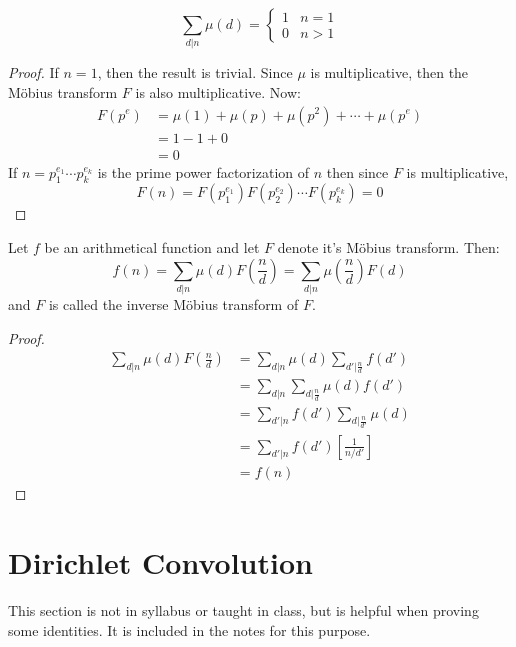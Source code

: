 \documentclass[12pt,letterpaper]{book}
\theoremstyle{definition}
\begin{document}
\begin{lemma}
  \[\sum_{d|n} \mu(d) = \begin{cases} 
    1 & n=1 \\
    0 & n > 1
  \end{cases}\] 
\end{lemma}
\begin{proof}
  If $n=1$, then the result is trivial. Since $\mu$ is multiplicative, then the M\"{o}bius transform $F$ is also multiplicative. Now:
  \begin{align*}
    F(p^e) &= \mu(1) + \mu(p) + \mu(p^2) + \cdots + \mu(p^e) \\
           &= 1-1+0\\
           &= 0
  \end{align*}
  If $n = p_1^{e_1} \cdots p_k^{e_k}$ is the prime power factorization of $n$ then since $F$ is multiplicative,
  \[F(n) = F(p_1^{e_1}) F(p_2^{e_2}) \cdots F(p_k^{e_k}) = 0\]
\end{proof}

\begin{theorem}
  Let $f$ be an arithmetical function and let $F$ denote it's M\"{o}bius transform. Then:
  \[f(n) = \sum_{d|n} \mu(d) F \left( \frac{n}{d} \right) = \sum_{d|n} \mu \left( \frac{n}{d} \right)F(d)\]
  and $F$ is called the inverse M\"{o}bius transform of $F$.
\end{theorem}
\begin{proof}
  \begin{align*}
    \sum_{d|n} \mu(d) F \left(\frac{n}{d}\right) &= \sum_{d|n} \mu(d) \sum_{d'|\frac{n}{d}} f(d') \\
                                                 &= \sum_{d|n} \sum_{d|\frac{n}{d}} \mu(d) f(d') \\
                                                 &= \sum_{d'|n} f(d') \sum_{d|\frac{n}{d'}} \mu(d) \\
                                                 &= \sum_{d'|n} f(d') \left[ \frac{1}{n/d'} \right] \\
                                                 &= f(n)
  \end{align*}
\end{proof}

\section{Dirichlet Convolution}

This section is not in syllabus or taught in class, but is helpful when proving some identities. It is included in the notes for this purpose.
\end{document}
